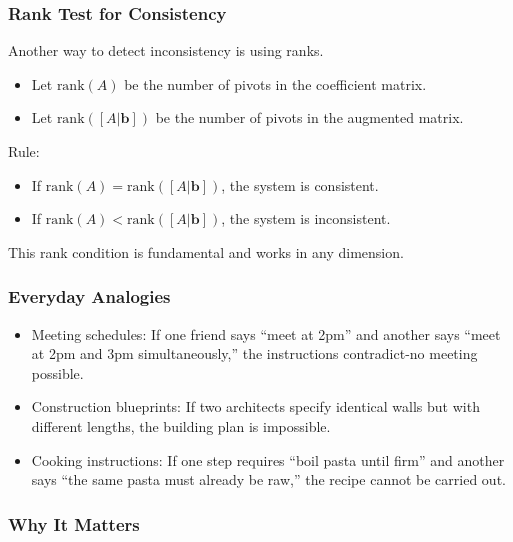 \documentclass[
  letterpaper,
  DIV=11,
  numbers=noendperiod]{scrreprt}
\providecommand{\tightlist}{%
  \setlength{\itemsep}{0pt}\setlength{\parskip}{0pt}}
\begin{document}
\subsubsection{Rank Test for
Consistency}\label{rank-test-for-consistency}

Another way to detect inconsistency is using ranks.

\begin{itemize}
\tightlist
\item
  Let \(\text{rank}(A)\) be the number of pivots in the coefficient
  matrix.
\item
  Let \(\text{rank}([A|\mathbf{b}])\) be the number of pivots in the
  augmented matrix.
\end{itemize}

Rule:

\begin{itemize}
\tightlist
\item
  If \(\text{rank}(A) = \text{rank}([A|\mathbf{b}])\), the system is
  consistent.
\item
  If \(\text{rank}(A) < \text{rank}([A|\mathbf{b}])\), the system is
  inconsistent.
\end{itemize}

This rank condition is fundamental and works in any dimension.

\subsubsection{Everyday Analogies}\label{everyday-analogies-22}

\begin{itemize}
\tightlist
\item
  Meeting schedules: If one friend says ``meet at 2pm'' and another says
  ``meet at 2pm and 3pm simultaneously,'' the instructions contradict-no
  meeting possible.
\item
  Construction blueprints: If two architects specify identical walls but
  with different lengths, the building plan is impossible.
\item
  Cooking instructions: If one step requires ``boil pasta until firm''
  and another says ``the same pasta must already be raw,'' the recipe
  cannot be carried out.
\end{itemize}

\subsubsection{Why It Matters}\label{why-it-matters-22}
\end{document}
